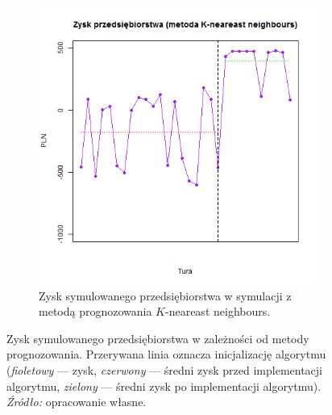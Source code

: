 \documentclass[polish, twoside, 12pt, a4paper]{article}
\theoremstyle{definition}
\theoremstyle{plain}
\theoremstyle{remark}
\begin{document}
\begin{figure}[hbt]
\begin{subfigure}[t]{0.6\textwidth}
    \includegraphics[width=\textwidth]{pictures/zysk_km.png}
    \caption{Zysk symulowanego przedsiębiorstwa w symulacji z metodą prognozowania $K$-neareast neighbours.}
    \label{fig:zysk}
  \end{subfigure}
  
  \captionsetup{margin=10pt,font=small,labelfont=bf,width=.8\textwidth}

  \caption[Zysk symulowanego przedsiębiorstwa w zależności od metody prognozowania]{Zysk symulowanego przedsiębiorstwa w zależności od metody prognozowania. Przerywana linia oznacza inicjalizację algorytmu (\textit{fioletowy} --- zysk, \textit{czerwony} --- średni zysk przed implementacji algorytmu, \textit{zielony} --- średni zysk po implementacji algorytmu). \textit{Źródło:} opracowanie własne.}\label{fig:wynikifin}
\end{figure}

\appendix

\clearpage



\clearpage
{}
\listoftables
\end{document}
